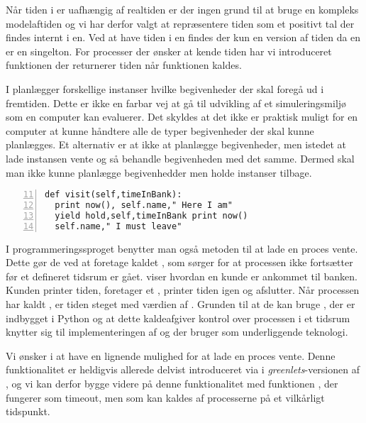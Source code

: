 Når tiden i \des er uafhængig af realtiden er der ingen grund til at bruge en kompleks modelaftiden og vi har derfor valgt at repræsentere tiden som et positivt tal der findes internt i \sched en.
Ved at have tiden i  \sched en findes der kun en version af tiden da  \sched en er en singelton. For processer der ønsker at kende tiden har vi
introduceret funktionen  der returnerer tiden når funktionen kaldes. 

I \des planlægger forskellige instanser hvilke begivenheder der skal foregå ud i fremtiden.  Dette er ikke en farbar vej at gå til udvikling af et simuleringsmiljø som en computer kan evaluerer. Det skyldes at det ikke er praktisk muligt for en computer at kunne håndtere alle de typer begivenheder der skal kunne planlægges. Et alternativ er at ikke at planlægge begivenheder, men istedet at lade instansen vente og så behandle begivenheden med det samme. Dermed skal man ikke kunne planlægge begivenhedder men holde instanser tilbage. 

\begin{lstlisting}[firstnumber=11 , stepnumber=2, numbers=left,float=hbtp, label=fig:simpy:yield, caption= Et yield i \simpy (Taget fra Bank05.py i eksemplet fra \simpy)] 
def visit(self,timeInBank): 
  print now(), self.name," Here I am" 
  yield hold,self,timeInBank print now()
  self.name," I must leave" 
\end{lstlisting}
I programmeringssproget \simpy benytter man også metoden til at lade en proces vente. Dette gør de ved at
foretage kaldet , som sørger for at processen ikke
fortsætter før et defineret tidsrum er gået.  viser hvordan en kunde er ankommet til banken. Kunden printer tiden, foretager et , printer tiden igen og afslutter.  Når processen har kaldt , er tiden steget med værdien af . Grunden til at de kan bruge , der er indbygget i Python og at dette kaldeafgiver kontrol over processen i et tidsrum  knytter sig til implementeringen af \simpy og der bruger   som underliggende teknologi. 

 Vi ønsker i \pycsp at have en lignende mulighed for at lade en proces vente. Denne funktionalitet er heldigvis allerede delvist introduceret via  i \emph{greenlets}-versionen af \pycsp, og vi kan derfor bygge videre på denne funktionalitet med funktionen , der fungerer som timeout, men som kan kaldes af processerne
på et vilkårligt tidspunkt. 

